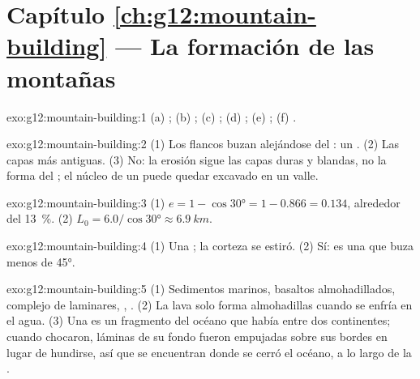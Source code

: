 \section*{Capítulo \ref{ch:g12:mountain-building} --- La formación de las montañas}

\begin{solution}{exo:g12:mountain-building:1}
(a) ; (b) ; (c) ; (d) ; (e) ;
(f) .
\end{solution}

\begin{solution}{exo:g12:mountain-building:2}
(1) Los flancos buzan alejándose del : un . (2) Las
capas más antiguas. (3) No: la erosión sigue las capas duras y blandas, no la
forma del ; el núcleo de un  puede quedar excavado en un valle.
\end{solution}

\begin{solution}{exo:g12:mountain-building:3}
(1) $e = 1 - \cos\ang{30} = 1 - 0.866 = 0.134$, alrededor del \qty{13}{\percent}.
(2) $L_0 = 6.0/\cos\ang{30} \approx \qty{6.9}{km}$.
\end{solution}

\begin{solution}{exo:g12:mountain-building:4}
(1) Una ; la corteza se estiró. (2) Sí: es una  que
buza menos de \ang{45}.
\end{solution}

\begin{solution}{exo:g12:mountain-building:5}
(1) Sedimentos marinos, basaltos almohadillados, complejo de  laminares,
, . (2) La lava solo forma almohadillas cuando se enfría en el
agua. (3) Una  es un fragmento del océano que había entre dos
continentes; cuando chocaron, láminas de su fondo fueron empujadas sobre sus
bordes en lugar de hundirse, así que se encuentran donde se cerró el océano,
a lo largo de la .
\end{solution}

